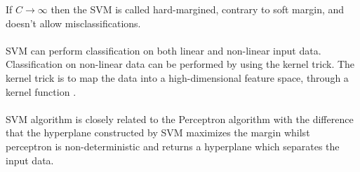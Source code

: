 If $C \rightarrow \infty$ then the SVM is called hard-margined, contrary to soft margin, and doesn't allow misclassifications.
\\\\
SVM can perform classification on both linear and non-linear input data. Classification on non-linear data can be performed by using the kernel trick. The kernel trick is to map the data into a high-dimensional feature space, through a kernel function \citep{svm_ai}. 
\\\\
SVM algorithm is closely related to the Perceptron algorithm with the difference that the hyperplane constructed by SVM maximizes the margin whilst perceptron is non-deterministic and returns a hyperplane which separates the input data.
